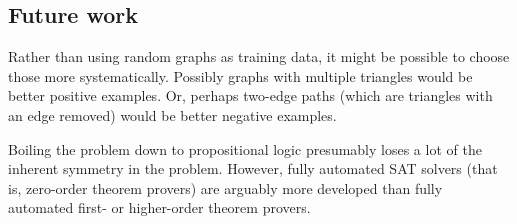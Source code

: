 \documentclass[12pt]{article}
\begin{document}
\subsection{Future work}

Rather than using random graphs as training data, it might be possible to choose those
more systematically. Possibly graphs with multiple triangles would be 
better positive examples.
Or, perhaps two-edge paths (which are triangles with an edge removed) would be better negative
examples.

Boiling the problem down to propositional logic presumably loses a lot of the inherent
symmetry in the problem. However, fully automated SAT solvers (that is, zero-order
theorem provers) are arguably more developed
than fully automated first- or higher-order theorem provers.



\end{document}

